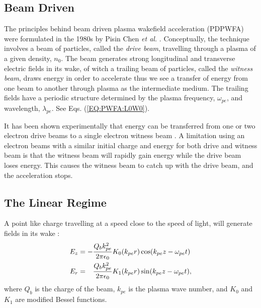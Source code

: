 \subsection{Beam Driven}
\label{Int:PDPWFA}

The principles behind beam driven plasma wakefield acceleration (PDPWFA) were formulated in the 1980s by Pisin Chen \emph{et al.} \cite{chen:1985}. Conceptually, the technique involves a beam of particles, called the \emph{drive beam}, travelling through a plasma of a given density, $n_{0}$. The beam generates strong longitudinal and transverse electric fields in its wake, of witch a trailing beam of particles, called the \emph{witness beam}, draws energy in order to accelerate \dash thus we see a transfer of energy from one beam to another through plasma as the intermediate medium. The trailing fields have a periodic structure determined by the plasma frequency, $\omega_{pe}$, and wavelength, $\lambda_{pe}$. See Eqs. (\ref{EQ:PWFA:L0W0}).

It has been shown experimentally that energy can be transferred from one or two electron drive beams to a single electron witness beam \cite{rosenzweig:1988, blumenfeld:2007, kallos:2008, litos:2014}. A limitation using an electron beams with a similar initial charge and energy for both drive and witness beam is that the witness beam will rapidly gain energy while the drive beam loses energy. This causes the witness beam to catch up with the drive beam, and the acceleration stops. 

\subsection{The Linear Regime}
\label{Int:PWFA:Lin}

A point like charge travelling at a speed close to the speed of light, will generate fields in its wake \cite{van_der_meer:1985,chen:1985}:
\begin{align}
    E_{z} &= -\frac{Q_{b}k_{pe}^{2}}{2\pi\epsilon_{0}} K_{0}(k_{pe}r)\cos(k_{pe}z - \omega_{pe}t) \label{EQ:PWFA:EZ} \\
    E_{r} &= \hphantom{-} \frac{Q_{b}k_{pe}^{2}}{2\pi\epsilon_{0}} K_{1}(k_{pe}r)\sin(k_{pe}z - \omega_{pe}t), \label{EQ:PWFA:ER}
\end{align}
where $Q_{b}$ is the charge of the beam, $k_{pe}$ is the plasma wave number, and $K_{0}$ and $K_{1}$ are modified Bessel functions. 


